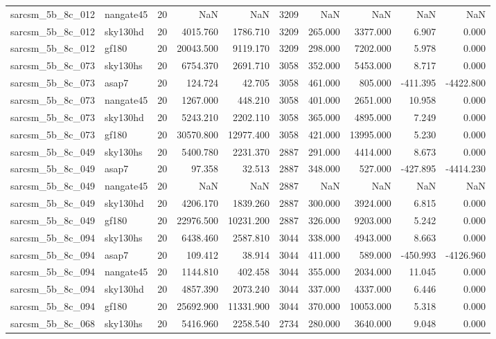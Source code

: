 \begin{longtable}{llrrrrrrrr}
sarcsm\_5b\_8c\_012 & nangate45 & 20 & NaN & NaN & 3209 & NaN & NaN & NaN & NaN \\
sarcsm\_5b\_8c\_012 & sky130hd & 20 & 4015.760 & 1786.710 & 3209 & 265.000 & 3377.000 & 6.907 & 0.000 \\
sarcsm\_5b\_8c\_012 & gf180 & 20 & 20043.500 & 9119.170 & 3209 & 298.000 & 7202.000 & 5.978 & 0.000 \\
sarcsm\_5b\_8c\_073 & sky130hs & 20 & 6754.370 & 2691.710 & 3058 & 352.000 & 5453.000 & 8.717 & 0.000 \\
sarcsm\_5b\_8c\_073 & asap7 & 20 & 124.724 & 42.705 & 3058 & 461.000 & 805.000 & -411.395 & -4422.800 \\
sarcsm\_5b\_8c\_073 & nangate45 & 20 & 1267.000 & 448.210 & 3058 & 401.000 & 2651.000 & 10.958 & 0.000 \\
sarcsm\_5b\_8c\_073 & sky130hd & 20 & 5243.210 & 2202.110 & 3058 & 365.000 & 4895.000 & 7.249 & 0.000 \\
sarcsm\_5b\_8c\_073 & gf180 & 20 & 30570.800 & 12977.400 & 3058 & 421.000 & 13995.000 & 5.230 & 0.000 \\
sarcsm\_5b\_8c\_049 & sky130hs & 20 & 5400.780 & 2231.370 & 2887 & 291.000 & 4414.000 & 8.673 & 0.000 \\
sarcsm\_5b\_8c\_049 & asap7 & 20 & 97.358 & 32.513 & 2887 & 348.000 & 527.000 & -427.895 & -4414.230 \\
sarcsm\_5b\_8c\_049 & nangate45 & 20 & NaN & NaN & 2887 & NaN & NaN & NaN & NaN \\
sarcsm\_5b\_8c\_049 & sky130hd & 20 & 4206.170 & 1839.260 & 2887 & 300.000 & 3924.000 & 6.815 & 0.000 \\
sarcsm\_5b\_8c\_049 & gf180 & 20 & 22976.500 & 10231.200 & 2887 & 326.000 & 9203.000 & 5.242 & 0.000 \\
sarcsm\_5b\_8c\_094 & sky130hs & 20 & 6438.460 & 2587.810 & 3044 & 338.000 & 4943.000 & 8.663 & 0.000 \\
sarcsm\_5b\_8c\_094 & asap7 & 20 & 109.412 & 38.914 & 3044 & 411.000 & 589.000 & -450.993 & -4126.960 \\
sarcsm\_5b\_8c\_094 & nangate45 & 20 & 1144.810 & 402.458 & 3044 & 355.000 & 2034.000 & 11.045 & 0.000 \\
sarcsm\_5b\_8c\_094 & sky130hd & 20 & 4857.390 & 2073.240 & 3044 & 337.000 & 4337.000 & 6.446 & 0.000 \\
sarcsm\_5b\_8c\_094 & gf180 & 20 & 25692.900 & 11331.900 & 3044 & 370.000 & 10053.000 & 5.318 & 0.000 \\
sarcsm\_5b\_8c\_068 & sky130hs & 20 & 5416.960 & 2258.540 & 2734 & 280.000 & 3640.000 & 9.048 & 0.000 \\

\end{longtable}
